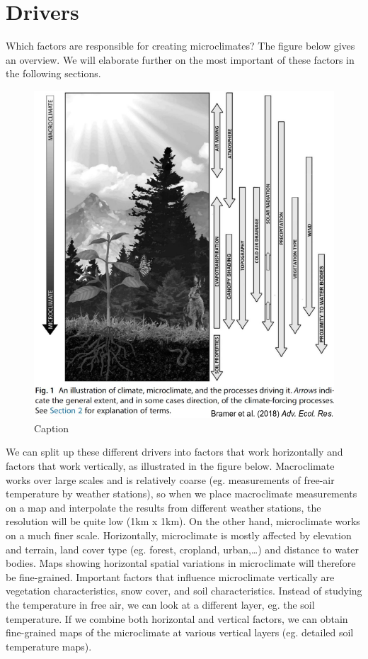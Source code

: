 \documentclass[12pt,oneside]{book}
\begin{document}
\section{Drivers}\label{drivers}

Which factors are responsible for creating microclimates? The figure
below gives an overview. We will elaborate further on the most important
of these factors in the following sections.

\begin{figure}

{\centering \includegraphics[width=1\linewidth]{figures/Figure1011} 

}

\caption{Caption}\label{fig:Micro11}
\end{figure}

We can split up these different drivers into factors that work
horizontally and factors that work vertically, as illustrated in the
figure below. Macroclimate works over large scales and is relatively
coarse (eg. measurements of free-air temperature by weather stations),
so when we place macroclimate measurements on a map and interpolate the
results from different weather stations, the resolution will be quite
low (1km x 1km). On the other hand, microclimate works on a much finer
scale. Horizontally, microclimate is mostly affected by elevation and
terrain, land cover type (eg. forest, cropland, urban,\ldots{}) and
distance to water bodies. Maps showing horizontal spatial variations in
microclimate will therefore be fine-grained. Important factors that
influence microclimate vertically are vegetation characteristics, snow
cover, and soil characteristics. Instead of studying the temperature in
free air, we can look at a different layer, eg. the soil temperature. If
we combine both horizontal and vertical factors, we can obtain
fine-grained maps of the microclimate at various vertical layers (eg.
detailed soil temperature maps).
\end{document}
